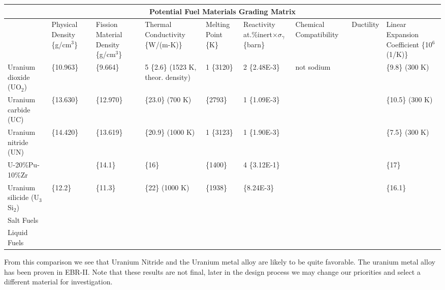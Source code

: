 \documentclass[]{report}
\begin{document}
\begin{center}
\hspace*{-2cm} %
\begin{tabular}[c]{| p{1.6cm} | p{1.2cm} | p{2.05cm} | p{1.5cm} | p{1.5cm} | p{2.0cm} | p{1.5cm} | p{1.5cm} | p{2cm} |}
\hline
\multicolumn{9}{|c|}{Potential Fuel Materials Grading Matrix} \\
\hline
 & Physical Density \{g/cm$^3$\} & Fission Material Density \{g/cm$^3$\} & Thermal Conductivity  \{W/(m-K)\} & Melting Point \{K\} & Reactivity at.\%inert$\times \sigma_{\gamma}$ \{barn\} & Chemical Compatibility & Ductility & Linear Expansion Coefficient \{10$^6$(1/K)\} \\
\hline
Uranium dioxide (UO$_2$) & \{10.963\} & \{9.664\} & 5 \{2.6\} (1523 K, theor. density) & 1 \{3120\} & 2 \{2.48E-3\} & not sodium & & \{9.8\} (300 K)  \\
\hline
Uranium carbide (UC) & \{13.630\} & \{12.970\} & \{23.0\} (700 K) & \{2793\} & 1 \{1.09E-3\} & & & \{10.5\} (300 K)\\
\hline
Uranium nitride (UN) & \{14.420\} & \{13.619\} & \{20.9\} (1000 K) & 1 \{3123\} & 1 \{1.90E-3\} & & & \{7.5\} (300 K) \\
\hline
U-20\%Pu-10\%Zr & & \{14.1\} & \{16\} & \{1400\} & 4 \{3.12E-1\} &  & & \{17\}\\
\hline
Uranium silicide (U$_3$Si$_2$)  & \{12.2\} & \{11.3\} & \{22\} (1000 K) & \{1938\} & \{8.24E-3\} & & & \{16.1\}\\
\hline
Salt Fuels &  \\
\hline
Liquid Fuels &  \\
\hline

\end{tabular}
\end{center}

From this comparison we see that Uranium Nitride and the Uranium metal alloy are likely to be quite favorable. The uranium metal alloy has been proven in EBR-II. Note that these results are not final, later in the design process we may change our priorities and select a different material for investigation.
\end{document}
